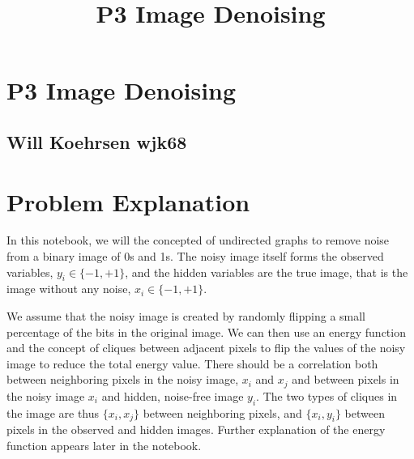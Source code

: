 \documentclass[11pt]{article}
\title{P3 Image Denoising}
\begin{document}
    
    
    \maketitle
    
    

    
    \hypertarget{p3-image-denoising}{%
\section{P3 Image Denoising}\label{p3-image-denoising}}

    \hypertarget{will-koehrsen-wjk68}{%
\subsection{Will Koehrsen wjk68}\label{will-koehrsen-wjk68}}

    \hypertarget{problem-explanation}{%
\section{Problem Explanation}\label{problem-explanation}}

In this notebook, we will the concepted of undirected graphs to remove
noise from a binary image of 0s and 1s. The noisy image itself forms the
observed variables, \(y_i \in \{−1, +1\}\), and the hidden variables are
the true image, that is the image without any noise,
\(x_i \in \{−1, +1\}\).

We assume that the noisy image is created by randomly flipping a small
percentage of the bits in the original image. We can then use an energy
function and the concept of cliques between adjacent pixels to flip the
values of the noisy image to reduce the total energy value. There should
be a correlation both between neighboring pixels in the noisy image,
\(x_i\) and \(x_j\) and between pixels in the noisy image \(x_i\) and
hidden, noise-free image \(y_i\). The two types of cliques in the image
are thus \(\{x_i, x_j\}\) between neighboring pixels, and
\(\{x_i, y_i\}\) between pixels in the observed and hidden images.
Further explanation of the energy function appears later in the
notebook.
\end{document}

